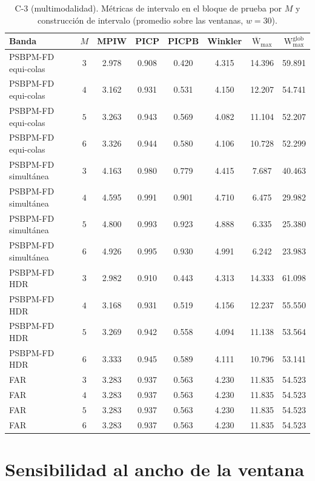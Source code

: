 \begin{table}[H]
\centering\footnotesize
\caption{C-3 (multimodalidad). Métricas de intervalo en el bloque de prueba por $M$ y construcción de intervalo (promedio sobre las ventanas, $w = 30$).}
\label{tab:aneB_B_C3}
\begin{tabular}{l c cccccc}
\hline
 Banda & $M$ & MPIW & PICP & PICPB & Winkler & $\overline{\mathrm{W}}_{\max}$ & $\mathrm{W}_{\max}^{\mathrm{glob}}$ \\
\hline
PSBPM-FD equi-colas & $3$ & 2.978 & 0.908 & 0.420 & 4.315 & 14.396 & 59.891 \\
PSBPM-FD equi-colas & $4$ & 3.162 & 0.931 & 0.531 & 4.150 & 12.207 & 54.741 \\
PSBPM-FD equi-colas & $5$ & 3.263 & 0.943 & 0.569 & 4.082 & 11.104 & 52.207 \\
PSBPM-FD equi-colas & $6$ & 3.326 & 0.944 & 0.580 & 4.106 & 10.728 & 52.299 \\
\hline
PSBPM-FD simultánea & $3$ & 4.163 & 0.980 & 0.779 & 4.415 & 7.687 & 40.463 \\
PSBPM-FD simultánea & $4$ & 4.595 & 0.991 & 0.901 & 4.710 & 6.475 & 29.982 \\
PSBPM-FD simultánea & $5$ & 4.800 & 0.993 & 0.923 & 4.888 & 6.335 & 25.380 \\
PSBPM-FD simultánea & $6$ & 4.926 & 0.995 & 0.930 & 4.991 & 6.242 & 23.983 \\
\hline
PSBPM-FD HDR & $3$ & 2.982 & 0.910 & 0.443 & 4.313 & 14.333 & 61.098 \\
PSBPM-FD HDR & $4$ & 3.168 & 0.931 & 0.519 & 4.156 & 12.237 & 55.550 \\
PSBPM-FD HDR & $5$ & 3.269 & 0.942 & 0.558 & 4.094 & 11.138 & 53.564 \\
PSBPM-FD HDR & $6$ & 3.333 & 0.945 & 0.589 & 4.111 & 10.796 & 53.141 \\
\hline
FAR & $3$ & 3.283 & 0.937 & 0.563 & 4.230 & 11.835 & 54.523 \\
FAR & $4$ & 3.283 & 0.937 & 0.563 & 4.230 & 11.835 & 54.523 \\
FAR & $5$ & 3.283 & 0.937 & 0.563 & 4.230 & 11.835 & 54.523 \\
FAR & $6$ & 3.283 & 0.937 & 0.563 & 4.230 & 11.835 & 54.523 \\
\hline
\end{tabular}
\end{table}

\section{Sensibilidad al ancho de la ventana}
\label{aneB_00_02_sensibilidad_ventana}

